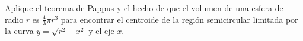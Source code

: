 \item Aplique el teorema de Pappus y el hecho de que el volumen de una esfera de radio $r$ es $\frac{4}{3}\pi r^3$ para encontrar el centroide de la región semicircular limitada por la curva $y = \sqrt{r^2 - x^2}$ y el eje $x$.
